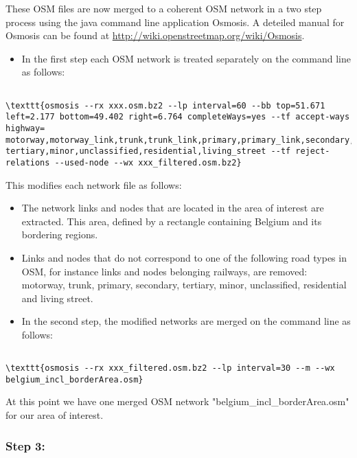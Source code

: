 \documentclass[a4paper,11pt]{report}
\begin{document}
These OSM files are now merged to a coherent OSM network in a two  step process using the java command line application Osmosis. A deteiled  manual for Osmosis can be found at \href{http://wiki.openstreetmap.org/wiki/Osmosis}{http://wiki.openstreetmap.org/wiki/Osmosis}.
\begin{itemize}
	\item In the first step each OSM network is treated separately on the command line as follows:
\end{itemize}
\begin{verbatim}

\texttt{osmosis --rx xxx.osm.bz2 --lp interval=60 --bb top=51.671 left=2.177 bottom=49.402 right=6.764 completeWays=yes --tf accept-ways highway= motorway,motorway_link,trunk,trunk_link,primary,primary_link,secondary, tertiary,minor,unclassified,residential,living_street --tf reject-relations --used-node --wx xxx_filtered.osm.bz2}
\end{verbatim}

This modifies each network file as follows:
\begin{itemize}
	\item The network links and nodes that are  located in the area of interest are extracted. This area, defined by a  rectangle containing Belgium and its bordering regions.
	\item Links and nodes that do not correspond  to one of the following road types in OSM, for instance links and nodes  belonging railways, are removed: motorway, trunk, primary, secondary,  tertiary, minor, unclassified, residential and living street.
\end{itemize}
\begin{itemize}
	\item In the second step, the modified networks are merged on the command line as follows:
\end{itemize}
\begin{verbatim}

\texttt{osmosis --rx xxx_filtered.osm.bz2 --lp interval=30 --m --wx belgium_incl_borderArea.osm}
\end{verbatim}

At this point we have one merged OSM network "belgium\_incl\_borderArea.osm" for our area of interest.

\subsubsection{Step 3:}
\end{document}
